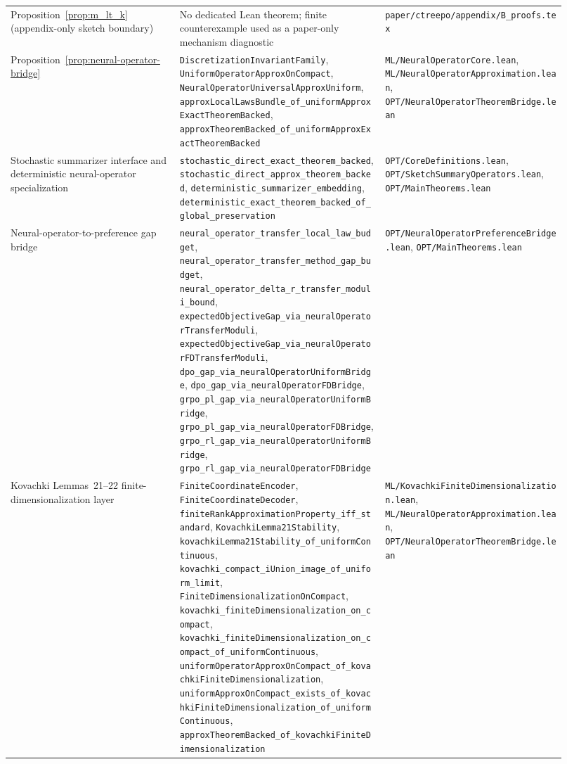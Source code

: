 {\begin{longtable}{p{0.28\linewidth}p{0.34\linewidth}p{0.30\linewidth}}
Proposition~\ref{prop:m_lt_k} (appendix-only sketch boundary) &
No dedicated Lean theorem; finite counterexample used as a paper-only mechanism diagnostic &
\texttt{paper/ctreepo/appendix/B\_proofs.tex} \\

Proposition~\ref{prop:neural-operator-bridge} &
\texttt{DiscretizationInvariantFamily}, \texttt{UniformOperatorApproxOnCompact}, \texttt{NeuralOperatorUniversalApproxUniform}, \texttt{approxLocalLawsBundle\_of\_uniformApproxExactTheoremBacked}, \texttt{approxTheoremBacked\_of\_uniformApproxExactTheoremBacked} &
\texttt{ML/NeuralOperatorCore.lean}, \texttt{ML/NeuralOperatorApproximation.lean}, \texttt{OPT/NeuralOperatorTheoremBridge.lean} \\

Stochastic summarizer interface and deterministic neural-operator specialization &
\texttt{stochastic\_direct\_exact\_theorem\_backed}, \texttt{stochastic\_direct\_approx\_theorem\_backed}, \texttt{deterministic\_summarizer\_embedding}, \texttt{deterministic\_exact\_theorem\_backed\_of\_global\_preservation} &
\texttt{OPT/CoreDefinitions.lean}, \texttt{OPT/SketchSummaryOperators.lean}, \texttt{OPT/MainTheorems.lean} \\

Neural-operator-to-preference gap bridge &
\texttt{neural\_operator\_transfer\_local\_law\_budget}, \texttt{neural\_operator\_transfer\_method\_gap\_budget}, \texttt{neural\_operator\_delta\_r\_transfer\_moduli\_bound}, \texttt{expectedObjectiveGap\_via\_neuralOperatorTransferModuli}, \texttt{expectedObjectiveGap\_via\_neuralOperatorFDTransferModuli}, \texttt{dpo\_gap\_via\_neuralOperatorUniformBridge}, \texttt{dpo\_gap\_via\_neuralOperatorFDBridge}, \texttt{grpo\_pl\_gap\_via\_neuralOperatorUniformBridge}, \texttt{grpo\_pl\_gap\_via\_neuralOperatorFDBridge}, \texttt{grpo\_rl\_gap\_via\_neuralOperatorUniformBridge}, \texttt{grpo\_rl\_gap\_via\_neuralOperatorFDBridge} &
\texttt{OPT/NeuralOperatorPreferenceBridge.lean}, \texttt{OPT/MainTheorems.lean} \\

Kovachki Lemmas~21--22 finite-dimensionalization layer &
\texttt{FiniteCoordinateEncoder}, \texttt{FiniteCoordinateDecoder}, \texttt{finiteRankApproximationProperty\_iff\_standard}, \texttt{KovachkiLemma21Stability}, \texttt{kovachkiLemma21Stability\_of\_uniformContinuous}, \texttt{kovachki\_compact\_iUnion\_image\_of\_uniform\_limit}, \texttt{FiniteDimensionalizationOnCompact}, \texttt{kovachki\_finiteDimensionalization\_on\_compact}, \texttt{kovachki\_finiteDimensionalization\_on\_compact\_of\_uniformContinuous}, \texttt{uniformOperatorApproxOnCompact\_of\_kovachkiFiniteDimensionalization}, \texttt{uniformApproxOnCompact\_exists\_of\_kovachkiFiniteDimensionalization\_of\_uniformContinuous}, \texttt{approxTheoremBacked\_of\_kovachkiFiniteDimensionalization} &
\texttt{ML/KovachkiFiniteDimensionalization.lean}, \texttt{ML/NeuralOperatorApproximation.lean}, \texttt{OPT/NeuralOperatorTheoremBridge.lean} \\


\end{longtable}}
